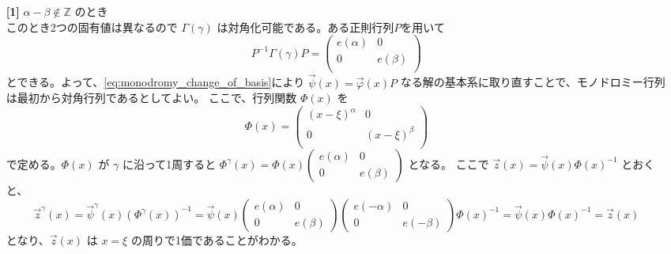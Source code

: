 \documentclass[paper=a4, fontsize=11pt]{jlreq} %
\theoremstyle{break}
\theoremstyle{qa}
\theoremstyle{remark} %
\begin{document}
\begin{itemize}
    \item[\textbf{[1]}] $\alpha-\beta \notin \mathbb{Z}$ のとき\\
    このとき2つの固有値は異なるので $\Gamma(\gamma)$ は対角化可能である。ある正則行列$P$を用いて
    \[
    P^{-1}\Gamma(\gamma)P=
    \begin{pmatrix}
        e(\alpha) & 0 \\
        0 & e(\beta) \\
    \end{pmatrix}
    \]
    とできる。よって、\eqref{eq:monodromy_change_of_basis}により $\vec{\psi}(x)=\vec{\varphi}(x)P$ なる解の基本系に取り直すことで、モノドロミー行列は最初から対角行列であるとしてよい。
    ここで、行列関数 $\Phi(x)$ を
    \[
    \Phi(x)=
    \begin{pmatrix}
        (x-\xi)^{\alpha} & 0 \\
        0 & (x-\xi)^{\beta} \\
    \end{pmatrix}
    \]
    で定める。$\Phi(x)$ が $\gamma$ に沿って1周すると $\Phi^{\gamma}(x) = \Phi(x) \begin{pmatrix} e(\alpha) & 0 \\ 0 & e(\beta) \end{pmatrix}$ となる。
    ここで $\vec{z}(x)=\vec{\psi}(x)\Phi(x)^{-1}$ とおくと、
    \[
    \vec{z}^{\gamma}(x) = \vec{\psi}^{\gamma}(x)\left(\Phi^{\gamma}(x)\right)^{-1} 
    = \vec{\psi}(x)\begin{pmatrix} e(\alpha) & 0 \\ 0 & e(\beta) \end{pmatrix} \begin{pmatrix} e(-\alpha) & 0 \\ 0 & e(-\beta) \end{pmatrix}\Phi(x)^{-1} 
    = \vec{\psi}(x)\Phi(x)^{-1} = \vec{z}(x)
    \]
    となり、$\vec{z}(x)$ は $x=\xi$ の周りで1価であることがわかる。


\end{itemize}
\end{document}

